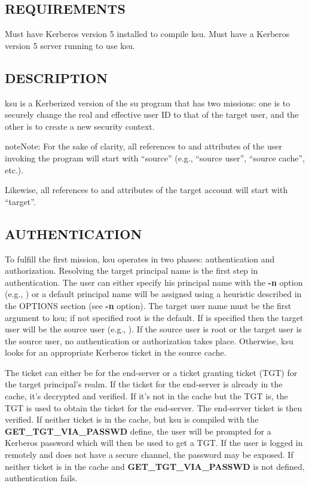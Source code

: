 \documentclass[letterpaper,10pt,english]{sphinxmanual}
\begin{document}
\subsection{REQUIREMENTS}
\label{user/user_commands/ksu:requirements}
Must have Kerberos version 5 installed to compile ksu.  Must have a
Kerberos version 5 server running to use ksu.


\subsection{DESCRIPTION}
\label{user/user_commands/ksu:description}
ksu is a Kerberized version of the su program that has two missions:
one is to securely change the real and effective user ID to that of
the target user, and the other is to create a new security context.

\begin{notice}{note}{Note:}
For the sake of clarity, all references to and attributes of
the user invoking the program will start with ``source''
(e.g., ``source user'', ``source cache'', etc.).

Likewise, all references to and attributes of the target
account will start with ``target''.
\end{notice}


\subsection{AUTHENTICATION}
\label{user/user_commands/ksu:authentication}
To fulfill the first mission, ksu operates in two phases:
authentication and authorization.  Resolving the target principal name
is the first step in authentication.  The user can either specify his
principal name with the \textbf{-n} option (e.g., )
or a default principal name will be assigned using a heuristic
described in the OPTIONS section (see \textbf{-n} option).  The target user
name must be the first argument to ksu; if not specified root is the
default.  If  is specified then the target user will be the
source user (e.g., ).  If the source user is root or the
target user is the source user, no authentication or authorization
takes place.  Otherwise, ksu looks for an appropriate Kerberos ticket
in the source cache.

The ticket can either be for the end-server or a ticket granting
ticket (TGT) for the target principal's realm.  If the ticket for the
end-server is already in the cache, it's decrypted and verified.  If
it's not in the cache but the TGT is, the TGT is used to obtain the
ticket for the end-server.  The end-server ticket is then verified.
If neither ticket is in the cache, but ksu is compiled with the
\textbf{GET\_TGT\_VIA\_PASSWD} define, the user will be prompted for a
Kerberos password which will then be used to get a TGT.  If the user
is logged in remotely and does not have a secure channel, the password
may be exposed.  If neither ticket is in the cache and
\textbf{GET\_TGT\_VIA\_PASSWD} is not defined, authentication fails.
\end{document}
